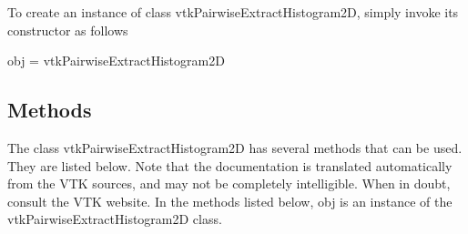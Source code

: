 To create an instance of class vtk\-Pairwise\-Extract\-Histogram2\-D, simply invoke its constructor as follows \begin{DoxyVerb}  obj = vtkPairwiseExtractHistogram2D
\end{DoxyVerb}
 \hypertarget{vtkwidgets_vtkxyplotwidget_Methods}{}\subsection{Methods}\label{vtkwidgets_vtkxyplotwidget_Methods}
The class vtk\-Pairwise\-Extract\-Histogram2\-D has several methods that can be used. They are listed below. Note that the documentation is translated automatically from the V\-T\-K sources, and may not be completely intelligible. When in doubt, consult the V\-T\-K website. In the methods listed below, {\ttfamily obj} is an instance of the vtk\-Pairwise\-Extract\-Histogram2\-D class. 

